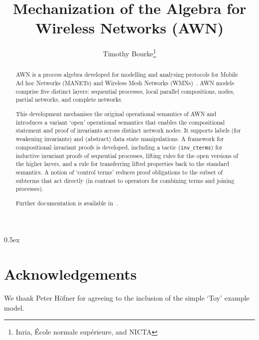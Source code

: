 \documentclass[11pt,a4paper]{article}
\begin{document}
\title{Mechanization of the Algebra for Wireless Networks (AWN)}
\author{Timothy Bourke\thanks{Inria, \'Ecole normale sup\'erieure, and 
NICTA}}
\maketitle

\begin{abstract}
AWN is a process algebra developed for modelling and analysing protocols for 
Mobile Ad hoc Networks (MANETs) and Wireless Mesh Networks 
(WMNs)~\cite[]{FehnkerEtAl:AWN:2013}.
AWN models comprise five distinct layers: sequential processes, local 
parallel compositions, nodes, partial networks, and complete networks.

This development mechanises the original operational semantics of AWN and 
introduces a variant `open' operational semantics that enables the 
compositional statement and proof of invariants across distinct network 
nodes.
It supports labels (for weakening invariants) and (abstract) data state 
manipulations.
A framework for compositional invariant proofs is developed, including a 
tactic (\verb|inv_cterms|) for inductive invariant proofs of sequential 
processes, lifting rules for the open versions of the higher layers, and a 
rule for transferring lifted properties back to the standard semantics.
A notion of `control terms' reduces proof obligations to the subset of 
subterms that act directly (in contrast to operators for combining terms and 
joining processes).

Further documentation is available in~\cite{BourkeEtAl:MechAWN:2014}.

\end{abstract}

\tableofcontents

\parindent 0pt\parskip 0.5ex

\newpage


\section{Acknowledgements}

We thank Peter H\"ofner for agreeing to the inclusion of the simple `Toy' 
example model.



\end{document}
